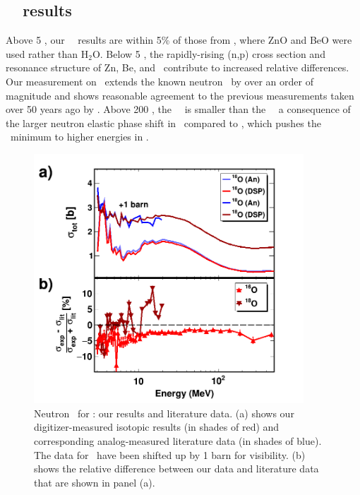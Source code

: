 \subsection{\oSixEight\ \tot\ results}
Above 5 \mega\electronvolt, our \oSix\ \tot\ results are within 5\% of those from \cite{Finlay1993}, where
ZnO and BeO were used rather than H$_{2}$O. Below 5 \mega\electronvolt, the rapidly-rising
(n,p) cross section and resonance structure of Zn, Be, and \oSix\ contribute to
increased relative differences. Our measurement on \oEight\ extends the known
neutron \tot\ by over an order of magnitude and shows reasonable agreement to
the previous measurements taken over 50 years ago by \cite{Vaughn1965,Salisbury1965}.
Above 200 \mega\electronvolt, the \oEight\ \tot\ is smaller than the \oSix\ \tot\, a
consequence of the larger neutron elastic phase shift in \oEight\ compared to
\oSix, which pushes the \tot\ minimum to higher energies in \oEight.
\begin{figure}[tb]
    \centering
    \includegraphics[width=0.9\textwidth]{figures/TwoPanelO.png}
    \caption[Neutron \tot\ for \oSixEight: our results and literature data]
    {Neutron \tot\ for \oSixEight: our results and literature data.
        (a) shows our digitizer-measured isotopic results (in shades of red) and
        corresponding analog-measured literature data \cite{Finlay1993, Perey1972, Vaughn1965,
        Salisbury1965} (in shades of blue). The data for \oEight\ have been
        shifted up by 1 barn for visibility.
        (b) shows the relative difference between our data
        and literature data that are shown in panel (a).
    }
    \label{TwoPanelO}
\end{figure}
